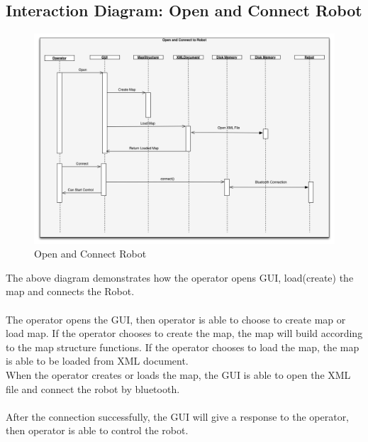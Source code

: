 \documentclass[11pt, a4paper]{report}
\begin{document}
\subsection{Interaction Diagram: Open and Connect Robot}
\begin{figure}[h]
  \centering
    \includegraphics[width=16cm]{Seq1.png}
  \caption{Open and Connect Robot}
\end{figure}
The above diagram demonstrates how the operator opens GUI, load(create) the map and connects the Robot.
\\ \\ The operator opens the GUI, then operator is able to choose to create map or load map. If the operator chooses to create the map, the map will build according to the map structure functions. If the operator chooses to load the map, the map is able to be loaded from XML document. 
\\When the operator creates or loads the map,  the GUI is able to open the XML file and connect the robot by bluetooth. \\ \\
After the connection successfully, the GUI will give a response to the operator, then operator is able to control the robot. 
\pagebreak
\end{document}
